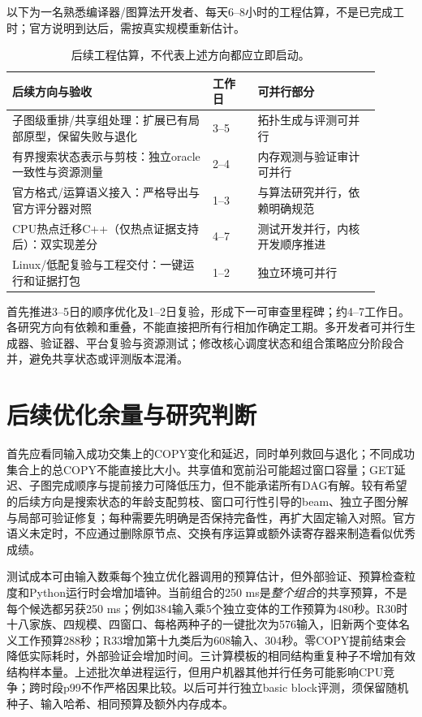\documentclass[UTF8,11pt,fontset=fandol]{ctexart}
\begin{document}
以下为一名熟悉编译器/图算法开发者、每天6--8小时的工程估算，不是已完成工时；官方说明到达后，需按真实规模重新估计。
\begin{table}[htbp]\centering\small
\begin{tabular}{p{0.49\linewidth}p{0.11\linewidth}p{0.30\linewidth}}\toprule
后续方向与验收 & 工作日 & 可并行部分\\\midrule
子图级重排/共享组处理：扩展已有局部原型，保留失败与退化 &3--5&拓扑生成与评测可并行\\
有界搜索状态表示与剪枝：独立oracle一致性与资源测量 &2--4&内存观测与验证审计可并行\\
官方格式/运算语义接入：严格导出与官方评分器对照 &1--3&与算法研究并行，依赖明确规范\\
CPU热点迁移C++（仅热点证据支持后）：双实现差分 &4--7&测试开发并行，内核开发顺序推进\\
Linux/低配复验与工程交付：一键运行和证据打包 &1--2&独立环境可并行\\\bottomrule
\end{tabular}\caption{后续工程估算，不代表上述方向都应立即启动。}\end{table}
首先推进3--5日的顺序优化及1--2日复验，形成下一可审查里程碑；约4--7工作日。各研究方向有依赖和重叠，不能直接把所有行相加作确定工期。多开发者可并行生成器、验证器、平台复验与资源测试；修改核心调度状态和组合策略应分阶段合并，避免共享状态或评测版本混淆。

\section{后续优化余量与研究判断}
首先应看同输入成功交集上的COPY变化和延迟，同时单列救回与退化；不同成功集合上的总COPY不能直接比大小。共享值和宽前沿可能超过窗口容量；GET延迟、子图完成顺序与提前接力可降低压力，但不能承诺所有DAG有解。较有希望的后续方向是搜索状态的年龄支配剪枝、窗口可行性引导的beam、独立子图分解与局部可验证修复；每种需要先明确是否保持完备性，再扩大固定输入对照。官方语义未定时，不应通过删除原节点、交换有序运算或额外读寄存器来制造看似优秀成绩。

测试成本可由输入数乘每个独立优化器调用的预算估计，但外部验证、预算检查粒度和Python运行时会增加墙钟。当前组合的250 ms是\emph{整个组合}的共享预算，不是每个候选都另获250 ms；例如384输入乘5个独立变体的工作预算为480秒。R30时十八家族、四规模、四窗口、每格两种子的一键批次为576输入，旧新两个变体名义工作预算288秒；R33增加第十九类后为608输入、304秒。零COPY提前结束会降低实际耗时，外部验证会增加时间。三计算模板的相同结构重复种子不增加有效结构样本量。上述批次单进程运行，但用户机器其他并行任务可能影响CPU竞争；跨时段p99不作严格因果比较。以后可并行独立basic block评测，须保留随机种子、输入哈希、相同预算及额外内存成本。
\end{document}
